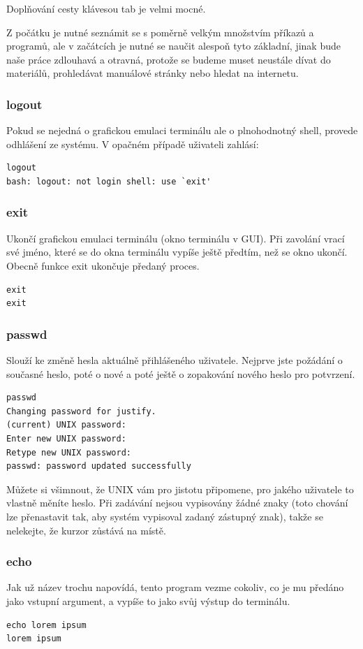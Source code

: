 \documentclass{article}
\begin{document}
\begin{center}
Doplňování cesty klávesou tab je velmi mocné. \cite{vychodilPrirucka}
\end{center}

Z počátku je nutné seznámit se s poměrně velkým množstvím příkazů a programů, ale v začátcích je nutné se naučit alespoň tyto základní, jinak bude naše práce zdlouhavá a otravná, protože se budeme muset neustále dívat do materiálů, prohledávat manuálové stránky nebo hledat na internetu.

\subsubsection{logout}
Pokud se nejedná o grafickou emulaci terminálu ale o plnohodnotný shell, provede odhlášení ze systému. V opačném případě uživateli zahlásí:
\begin{verbatim}
logout
bash: logout: not login shell: use `exit'
\end{verbatim}

\subsubsection{exit}
Ukončí grafickou emulaci terminálu (okno terminálu v GUI). Při zavolání vrací své jméno, které se do okna terminálu vypíše ještě předtím, než se okno ukončí. Obecně funkce exit ukončuje předaný proces.
\begin{verbatim}
exit
exit
\end{verbatim}

\subsubsection{passwd}
Slouží ke změně hesla aktuálně přihlášeného uživatele. Nejprve jste požádání o současné heslo, poté o nové a poté ještě o zopakování nového heslo pro potvrzení.
\begin{verbatim}
passwd
Changing password for justify.
(current) UNIX password: 
Enter new UNIX password: 
Retype new UNIX password: 
passwd: password updated successfully
\end{verbatim}
Můžete si všimnout, že UNIX vám pro jistotu připomene, pro jakého uživatele to vlastně měníte heslo. Při zadávání nejsou vypisovány žádné znaky (toto chování lze přenastavit tak, aby systém vypisoval zadaný zástupný znak), takže se nelekejte, že kurzor zůstává na místě.

\subsubsection{echo}
Jak už název trochu napovídá, tento program vezme cokoliv, co je mu předáno jako vstupní argument, a vypíše to jako svůj výstup do terminálu.
\begin{verbatim}
echo lorem ipsum
lorem ipsum
\end{verbatim}
\end{document}
